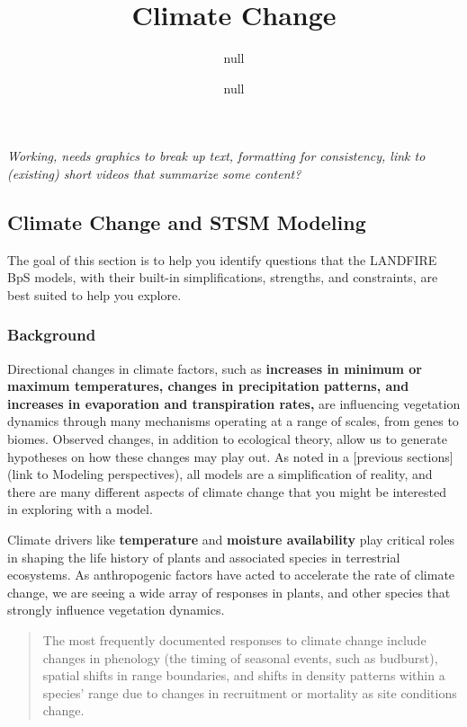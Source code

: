 \documentclass[
]{article}
\title{Climate Change}
\author{null}
\date{null}
\begin{document}
\maketitle

{
\setcounter{tocdepth}{4}
\tableofcontents
}
\emph{Working, needs graphics to break up text, formatting for
consistency, link to (existing) short videos that summarize some
content?}

\hypertarget{climate-change-and-stsm-modeling}{%
\subsection{Climate Change and STSM
Modeling}\label{climate-change-and-stsm-modeling}}

The goal of this section is to help you identify questions that the
LANDFIRE BpS models, with their built-in simplifications, strengths, and
constraints, are best suited to help you explore.

\hypertarget{background}{%
\subsubsection{Background}\label{background}}

Directional changes in climate factors, such as \textbf{increases in
minimum or maximum temperatures, changes in precipitation patterns, and
increases in evaporation and transpiration rates,} are influencing
vegetation dynamics through many mechanisms operating at a range of
scales, from genes to biomes. Observed changes, in addition to
ecological theory, allow us to generate hypotheses on how these changes
may play out. As noted in a {[}previous sections{]} (link to Modeling
perspectives), all models are a simplification of reality, and there are
many different aspects of climate change that you might be interested in
exploring with a model.

Climate drivers like \textbf{temperature} and \textbf{moisture
availability} play critical roles in shaping the life history of plants
and associated species in terrestrial ecosystems. As anthropogenic
factors have acted to accelerate the rate of climate change, we are
seeing a wide array of responses in plants, and other species that
strongly influence vegetation dynamics.

\begin{quote}
The most frequently documented responses to climate change include
changes in phenology (the timing of seasonal events, such as budburst),
spatial shifts in range boundaries, and shifts in density patterns
within a species' range due to changes in recruitment or mortality as
site conditions change.
\end{quote}
\end{document}
